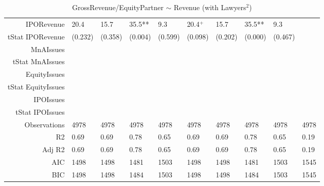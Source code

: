 \begin{table}[ht]
\begin{tabular}{rlllllllll}
  IPORevenue & 20.4 & 15.7 & 35.5** & 9.3 & 20.4$^{+}$ & 15.7 & 35.5** & 9.3 &  \\ 
  tStat IPORevenue & (0.232) & (0.358) & (0.004) & (0.599) & (0.098) & (0.202) & (0.000) & (0.467) &  \\ 
  MnAIssues &  &  &  &  &  &  &  &  &  \\ 
  tStat MnAIssues &  &  &  &  &  &  &  &  &  \\ 
  EquityIssues &  &  &  &  &  &  &  &  &  \\ 
  tStat EquityIssues &  &  &  &  &  &  &  &  &  \\ 
  IPOIssues &  &  &  &  &  &  &  &  &  \\ 
  tStat IPOIssues &  &  &  &  &  &  &  &  &  \\ 
  Observations & 4978 & 4978 & 4978 & 4978 & 4978 & 4978 & 4978 & 4978 & 4978 \\ 
  R2 & 0.69 & 0.69 & 0.78 & 0.65 & 0.69 & 0.69 & 0.78 & 0.65 & 0.19 \\ 
  Adj R2 & 0.69 & 0.69 & 0.78 & 0.65 & 0.69 & 0.69 & 0.78 & 0.65 & 0.19 \\ 
  AIC & 1498 & 1498 & 1481 & 1503 & 1498 & 1498 & 1481 & 1503 & 1545 \\ 
  BIC & 1498 & 1498 & 1484 & 1503 & 1498 & 1498 & 1484 & 1503 & 1545 \\ 
   \hline
\end{tabular}
\caption{GrossRevenue/EquityPartner $\sim$ Revenue (with Lawyers$^2$)} 
\end{table}
